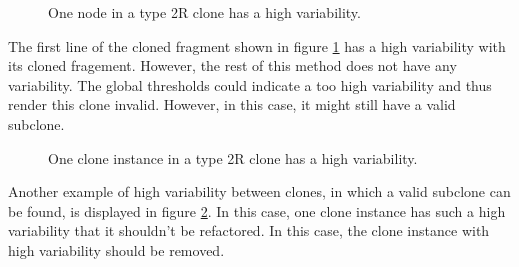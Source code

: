 \begin{figure}[H]
\begin{parcolumns}{2}
\end{parcolumns}
\caption{One node in a type 2R clone has a high variability.}
\label{fig:2rvariabilityhigh1}
\end{figure}

The first line of the cloned fragment shown in figure \ref{fig:2rvariabilityhigh1} has a high variability with its cloned fragement. However, the rest of this method does not have any variability. The global thresholds could indicate a too high variability and thus render this clone invalid. However, in this case, it might still have a valid subclone.

\begin{figure}[H]
\begin{parcolumns}{3}
\end{parcolumns}
\caption{One clone instance in a type 2R clone has a high variability.}
\label{fig:2rvariabilityhigh2}
\end{figure}

Another example of high variability between clones, in which a valid subclone can be found, is displayed in figure \ref{fig:2rvariabilityhigh2}. In this case, one clone instance has such a high variability that it shouldn't be refactored. In this case, the clone instance with high variability should be removed.

